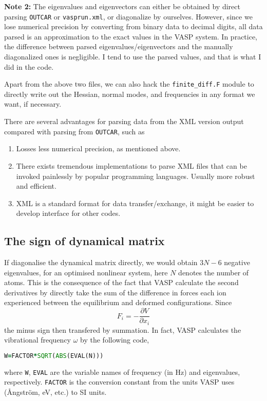 \documentclass[a4paper,notitlepage,preprint]{revtex4-1}
\begin{document}
{\color{red} {\bf Note 2:}} The eigenvalues and eigenvectors can either be obtained by direct parsing \verb|OUTCAR| or \verb|vasprun.xml|, or diagonalize by ourselves. However, since we lose numerical precision by converting from binary data to decimal digits, all data parsed is an approximation to the exact values in the VASP system. In practice, the difference between parsed eigenvalues/eigenvectors and the manually diagonalized ones is negligible. I tend to use the parsed values, and that is what I did in the code.
\vspace{1em}

Apart from the above two files, we can also hack the \verb|finite_diff.F| module to directly write out the Hessian, normal modes, and frequencies in any format we want, if necessary. 

There are several advantages for parsing data from the XML version output compared with parsing from \verb|OUTCAR|, such as
\begin{enumerate}
	\item Losses less numerical precision, as mentioned above.
	\item There exists tremendous implementations to parse XML files that can be invoked painlessly by popular programming languages. Usually more robust and efficient.
	\item XML is a standard format for data transfer/exchange, it might be easier to develop interface for other codes.
\end{enumerate} 

\subsection{The sign of dynamical matrix}
If diagonalise the dynamical matrix directly, we would obtain $3N-6$ negative eigenvalues, for an optimised nonlinear system, here $N$ denotes the number of atoms. This is the consequence of the fact that VASP calculate the second derivatives by directly take the sum of the difference in forces each ion experienced between the equilibrium and deformed configurations. Since
\begin{equation}
	F_i = - \frac{\partial V}{\partial x_i}
	\label{eq:FV}
\end{equation}
\noindent the minus sign then transfered by summation. In fact, VASP calculates the vibrational frequency $\omega$ by the following code,
\begin{lstlisting}[language=Fortran,firstnumber=1318]
	W=FACTOR*SQRT(ABS(EVAL(N)))
\end{lstlisting}
\noindent where \verb|W|, \verb|EVAL| are the variable names of frequency (in Hz) and eigenvalues, respectively. \verb|FACTOR| is the conversion constant from the units VASP uses ({\AA}ngstr\"om, eV, etc.) to SI units.
\end{document}
